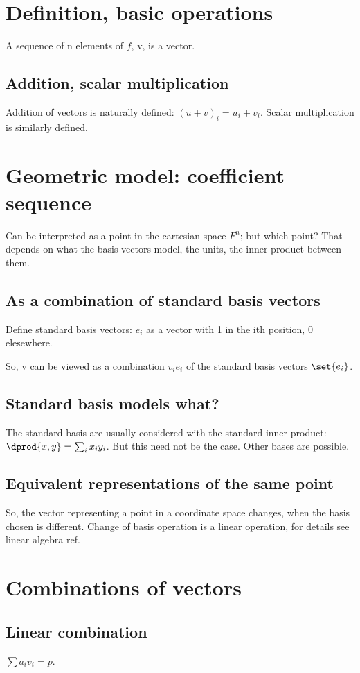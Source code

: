\documentclass[oneside, article]{memoir}
\begin{document}
\section{Definition, basic operations}
A sequence of n elements of $f$, v, is a vector.

\subsection{Addition, scalar multiplication}
Addition of vectors is naturally defined: $(u + v)_i = u_i + v_i$. Scalar multiplication is similarly defined.

\section{Geometric model: coefficient sequence}
Can be interpreted as a point in the cartesian space $F^{n}$; but which point? That depends on what the basis vectors model, the units, the inner product between them.

\subsection{As a combination of standard basis vectors}
Define standard basis vectors: $e_i$ as a vector with 1 in the ith position, 0 elesewhere.

So, v can be viewed as a combination $v_i e_i$ of the standard basis vectors $\set{e_i}$.

\subsection{Standard basis models what?}
The standard basis are usually considered with the standard inner product: $\dprod{x, y} = \sum_i x_i y_i$. But this need not be the case. Other bases are possible.

\subsection{Equivalent representations of the same point}
So, the vector representing a point in a coordinate space changes, when the basis chosen is different. Change of basis operation is a linear operation, for details see linear algebra ref.

\section{Combinations of vectors}
\subsection{Linear combination}
$\sum a_{i} v_{i} = p$.
\end{document}
